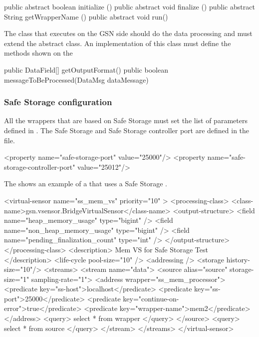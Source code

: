 \begin{javacode}[caption={Methods to implement for a Safe Storage Wrapper - Safe Storage Side}, label=listing:java:safestorage_methods_to_implement]
public abstract boolean initialize ()
public abstract void finalize ()
public abstract String getWrapperName () 
public abstract void run()
\end{javacode}

The class that executes on the GSN side should do the data processing and must extend the 
 abstract class.
An implementation of this class must define the methods shown on the 

\begin{javacode}[caption={Methods to implement for a Safe Storage Wrapper - GSN Side}, label=listing:java:safestorage_gsn_methods_to_implement]
public DataField[] getOutputFormat()
public boolean messageToBeProcessed(DataMsg dataMessage)
\end{javacode}

\subsubsection{Safe Storage configuration}

All the wrappers that are based on Safe Storage must set the list of parameters defined in .
The Safe Storage and Safe Storage controller port are defined in the  file.

\begin{xmlcode}[caption={Safe Storage ports}, label=listing:xml:safestorage_ports]
   <property name="safe-storage-port" value="25000"/>
   <property name="safe-storage-controller-port" value="25012"/>
\end{xmlcode}

The  shows an example of a \vsd that uses a Safe Storage \wrapper.

\begin{xmlcode}[caption={Sample of Email Notification VSD file}, label=listing:xml:safestorage_vsd]
<virtual-sensor name="ss_mem_vs" priority="10" >
	<processing-class>
		<class-name>gsn.vsensor.BridgeVirtualSensor</class-name>
		<output-structure>
			<field name="heap_memory_usage" type="bigint" />
			<field name="non_heap_memory_usage" type="bigint" />
			<field name="pending_finalization_count" type="int" />
		</output-structure>
	</processing-class>
	<description> Mem VS for Safe Storage Test </description>
	<life-cycle pool-size="10" />
	<addressing />
	<storage history-size="10"/>
	<streams>
		<stream name="data">
			<source alias="source" storage-size="1" sampling-rate="1">
				<address wrapper="ss_mem_processor">
					<predicate key="ss-host">localhost</predicate>
					<predicate key="ss-port">25000</predicate>
					<predicate key="continue-on-error">true</predicate>
					<predicate key="wrapper-name">mem2</predicate>
				</address>
				<query> select * from wrapper </query>
			</source>
			<query> select * from source </query>
		</stream>
	</streams>
</virtual-sensor>
\end{xmlcode}

